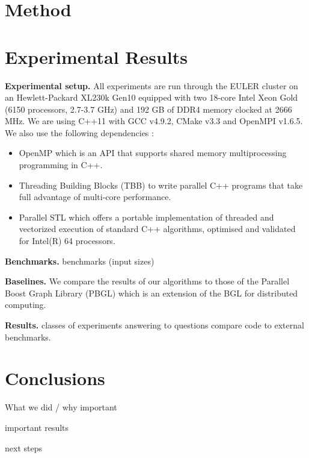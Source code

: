 \documentclass[letterpaper]{article}
\newcommand{\mypar}[1]{{\bf #1.}}
\begin{document}
\section{Method}\label{sec:method}


\section{Experimental Results}\label{sec:exp}


\mypar{Experimental setup} All experiments are run through the EULER cluster on an Hewlett-Packard XL230k Gen10 equipped with two 18-core Intel Xeon Gold (6150 processors, 2.7-3.7 GHz) and 192 GB of DDR4 memory clocked at 2666 MHz. We are using C++11 with GCC v4.9.2, CMake v3.3 and OpenMPI v1.6.5. We also use the following dependencies :
\begin{itemize}
    \item OpenMP which is an API that supports shared memory multiprocessing programming in C++.
    \item Threading Building Blocks (TBB) to write parallel C++ programs that take full advantage of multi-core performance.
    \item Parallel STL which offers a portable implementation of threaded and vectorized execution of standard C++ algorithms, optimised and validated for Intel(R) 64 processors.
\end{itemize}

\mypar{Benchmarks} 
benchmarks (input sizes)

\mypar{Baselines} We compare the results of our algorithms to those of the Parallel Boost Graph Library (PBGL) which is an extension of the BGL for distributed computing.

\mypar{Results}
classes of experiments answering to questions
compare code to external benchmarks.

\section{Conclusions}

What we did / why important

important results

next steps






\end{document}
